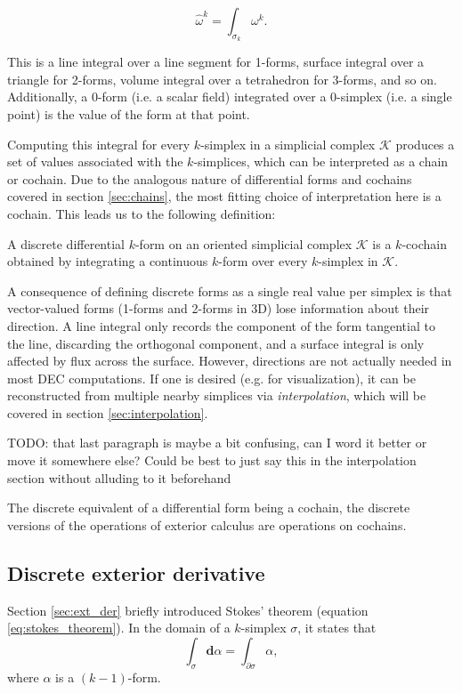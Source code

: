 \documentclass[utf8,english]{gradu3}
\begin{document}
\[
  \widehat{\omega}^k = \int_{\sigma_k} \omega^k.
\]

This is a line integral over a line segment for 1-forms,
surface integral over a triangle for 2-forms,
volume integral over a tetrahedron for 3-forms, and so on.
Additionally, a 0-form (i.e. a scalar field)
integrated over a 0-simplex (i.e. a single point)
is the value of the form at that point.

Computing this integral for every $k$-simplex in a simplicial complex $\mathcal{K}$
produces a set of values associated with the $k$-simplices,
which can be interpreted as a chain or cochain.
Due to the analogous nature of differential forms and cochains
covered in section \ref{sec:chains},
the most fitting choice of interpretation here is a cochain.
This leads us to the following definition:

A discrete differential $k$-form on an oriented simplicial complex $\mathcal{K}$
is a $k$-cochain obtained by integrating a continuous $k$-form
over every $k$-simplex in $\mathcal{K}$.

A consequence of defining discrete forms as a single real value per simplex
is that vector-valued forms (1-forms and 2-forms in 3D)
lose information about their direction.
A line integral only records the component of the form tangential to the line,
discarding the orthogonal component,
and a surface integral is only affected by flux across the surface.
However, directions are not actually needed in most DEC computations.
If one is desired (e.g. for visualization),
it can be reconstructed from multiple nearby simplices via \textit{interpolation},
which will be covered in section \ref{sec:interpolation}.

TODO: that last paragraph is maybe a bit confusing,
can I word it better or move it somewhere else?
Could be best to just say this in the interpolation section
without alluding to it beforehand

The discrete equivalent of a differential form being a cochain,
the discrete versions of the operations of exterior calculus
are operations on cochains.


\subsection{Discrete exterior derivative}\label{sec:disc_ext_der}

Section \ref{sec:ext_der} briefly introduced Stokes' theorem
(equation \ref{eq:stokes_theorem}).
In the domain of a $k$-simplex $\sigma$, it states that
\begin{equation}\label{eq:stokes_simplex}
  \int_{\sigma} \mathbf{d}\alpha = \int_{\partial\sigma} \alpha,
\end{equation}
where $\alpha$ is a $(k-1)$-form.
\end{document}
